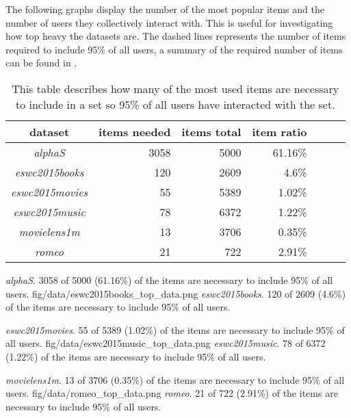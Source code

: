 The following graphs display the number of the most popular items and the number of users they collectively interact with. This is useful for investigating how top heavy the datasets are. The dashed lines represents the number of items required to include 95\% of all users, a summary of the required number of items can be found in .

\begin{table}[h!]
    \centering
    \begin{tabular}{| c | r | r | r | r | r | l |}
        \hline
        \textbf{dataset}        & \textbf{items needed}  & \textbf{items total} & \textbf{item ratio}  \\ \hline

        \textit{alphaS}         &   3058          & 5000 & 61.16\%              \\ \hline
        \textit{eswc2015books}  &   120           & 2609 & 4.6\%                \\ \hline
        \textit{eswc2015movies} &   55            & 5389 & 1.02\%               \\ \hline
        \textit{eswc2015music}  &   78            & 6372 & 1.22\%               \\ \hline
        \textit{movielens1m}    &   13            & 3706 & 0.35\%               \\ \hline
        \textit{romeo}          &   21            & 722  & 2.91\%               \\ \hline

    \end{tabular}
    \caption{This table describes how many of the most used items are necessary to include in a set so 95\% of all users have interacted with the set.}
    \label{tab:top_data}
\end{table}

{\textit{alphaS}. 3058 of 5000 (61.16\%) of the items are necessary to include 95\% of all users.}
{fig/data/eswc2015books_top_data.png}
{\textit{eswc2015books}. 120 of 2609 (4.6\%) of the items are necessary to include 95\% of all users.}

{\textit{eswc2015movies}. 55 of 5389 (1.02\%) of the items are necessary to include 95\% of all users.}
{fig/data/eswc2015music_top_data.png}
{\textit{eswc2015music}. 78 of 6372 (1.22\%) of the items are necessary to include 95\% of all users.}

{\textit{movielens1m}. 13 of 3706 (0.35\%) of the items are necessary to include 95\% of all users.}
{fig/data/romeo_top_data.png}
{\textit{romeo}. 21 of 722 (2.91\%) of the items are necessary to include 95\% of all users.}

